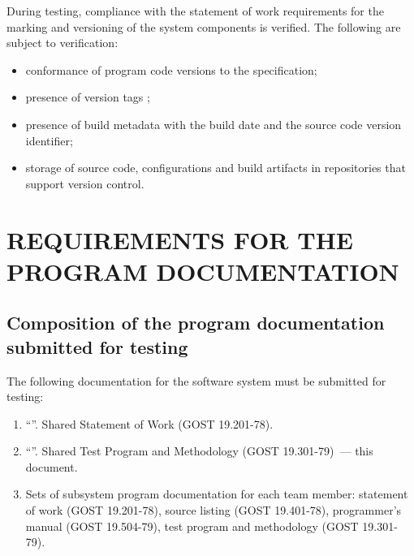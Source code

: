 \documentclass[12pt,a4paper]{extarticle}
\begin{document}
\begin{hseExample}
During testing, compliance with the statement of work requirements for the marking and versioning of the system components is verified. The following are subject to verification:

\begin{itemize}[leftmargin=1.25cm]
    \item conformance of program code versions to the  specification;
    \item presence of version tags ;
    \item presence of build metadata with the build date and the source code version identifier;
    \item storage of source code, configurations and build artifacts in repositories that support version control.
\end{itemize}
\end{hseExample}

\clearpage

\section{REQUIREMENTS FOR THE PROGRAM DOCUMENTATION}

\subsection{Composition of the program documentation submitted for testing}

The following documentation for the software system must be submitted for testing:
\begin{enumerate}[label=\arabic*), leftmargin=1.25cm]
    \item \enquote{\projectname}. Shared Statement of Work (GOST 19.201-78).
    \item \enquote{\projectname}. Shared Test Program and Methodology
          (GOST 19.301-79)~--- this document.
    \item Sets of subsystem program documentation for each team member:
          statement of work (GOST 19.201-78), source listing
          (GOST 19.401-78), programmer's manual (GOST 19.504-79),
          test program and methodology (GOST 19.301-79).
\end{enumerate}
\end{document}
